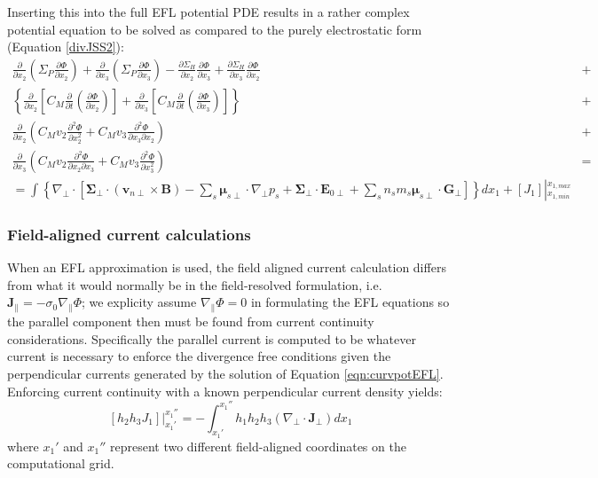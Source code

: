 \documentclass[11pt,letterpaper]{article}
\begin{document}
Inserting this into the full EFL potential PDE results in a rather complex potential equation to be solved as compared to the purely electrostatic form (Equation \ref{divJSS2}):
\begin{eqnarray}
\frac{\partial}{\partial x_2} \left( \Sigma_P \frac{\partial \Phi}{\partial x_2} \right) + \frac{\partial}{\partial x_3} \left( \Sigma_P \frac{\partial \Phi}{\partial x_3} \right) -  \frac{\partial \Sigma_H}{\partial x_2} \frac{\partial \Phi}{\partial x_3} + \frac{\partial \Sigma_H}{\partial x_3} \frac{\partial \Phi}{\partial x_2} &+& \nonumber \\ 
\left\{ \frac{\partial}{\partial x_2} \left[ C_M \frac{\partial}{\partial t} \left( \frac{\partial \Phi}{\partial x_2} \right) \right] + \frac{\partial}{\partial x_3} \left[ C_M \frac{\partial}{\partial t} \left( \frac{\partial \Phi}{\partial x_3} \right) \right] \right\} &+& \nonumber \\
\frac{\partial}{\partial x_2} \left( C_M v_2 \frac{\partial^2 \Phi}{\partial x_2^2} + C_M v_3 \frac{\partial^2 \Phi}{\partial x_3 \partial x_2} \right) &+& \nonumber \\
\frac{\partial}{\partial x_3} \left( C_M v_2 \frac{\partial^2 \Phi}{\partial x_2 \partial x_3} + C_M v_3 \frac{\partial^2 \Phi}{\partial x_3^2} \right) &=& \nonumber \\
= \int \left\{ \nabla_\perp \cdot \left[ \boldsymbol{\Sigma}_\perp \cdot \left( \mathbf{v}_{n\perp} \times \mathbf{B} \right)  - \sum_s \boldsymbol{\mu}_{s\perp} \cdot \nabla_\perp p_s + \boldsymbol{\Sigma}_\perp \cdot \mathbf{E}_{0\perp} + \sum_s n_s m_s  \boldsymbol{\mu}_{s\perp} \cdot \mathbf{G}_\perp \right] \right\} d x_1 + \left[J_1 \right] \left|^{x_{1,max}}_{x_{1,min}} \right. \label{eqn:electrodynamic}
\end{eqnarray}

\subsubsection{Field-aligned current calculations}

When an EFL approximation is used, the field aligned current calculation differs from what it would normally be in the field-resolved formulation, i.e. $\mathbf{J}_\parallel=-\sigma_0 \nabla_\parallel \Phi$; we explicity assume $\nabla_\parallel \Phi = 0$ in formulating the EFL equations so the parallel component then must be found from current continuity considerations.  Specifically the parallel current is computed to be whatever current is necessary to enforce the divergence free conditions given the perpendicular currents generated by the solution of Equation \ref{eqn:curvpotEFL}.  Enforcing current continuity with a known perpendicular current density yields:
\begin{equation}
\left. \left[ h_2 h_3 J_1 \right] \right|_{x_1'}^{x_1''} = - \int_{x_1'}^{x_{1}''} h_1 h_2 h_3 \left( \nabla_\perp \cdot \mathbf{J}_\perp \right) d x_1 \label{eqn:FACcalc}
\end{equation}
where $x_1'$ and $x_1''$ represent two different field-aligned coordinates on the computational grid.  
\end{document}
